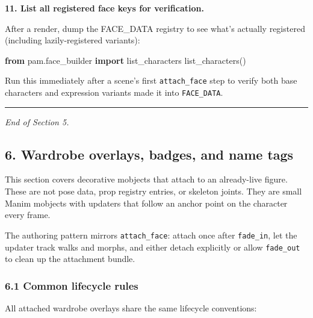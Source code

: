 \documentclass[
  12pt,
  letterpaper,
]{book}
\newenvironment{Shaded}{}{}
\newcommand{\ImportTok}[1]{\textcolor[rgb]{0.00,0.50,0.00}{\textbf{#1}}}
\newcommand{\NormalTok}[1]{#1}
\begin{document}
\textbf{11. List all registered face keys for verification.}

After a render, dump the FACE\_DATA registry to see what's actually
registered (including lazily-registered variants):

\begin{Shaded}
\begin{Highlighting}[]
\ImportTok{from}\NormalTok{ pam.face\_builder }\ImportTok{import}\NormalTok{ list\_characters}
\NormalTok{list\_characters()}
\end{Highlighting}
\end{Shaded}

Run this immediately after a scene's first \texttt{attach\_face} step to
verify both base characters and expression variants made it into
\texttt{FACE\_DATA}.

\begin{center}\rule{0.5\linewidth}{0.5pt}\end{center}

\emph{End of Section 5.}


\subsection{6. Wardrobe overlays, badges, and name
tags}\label{wardrobe-overlays-badges-and-name-tags}

This section covers decorative mobjects that attach to an already-live
figure. These are not pose data, prop registry entries, or skeleton
joints. They are small Manim mobjects with updaters that follow an
anchor point on the character every frame.

The authoring pattern mirrors \texttt{attach\_face}: attach once after
\texttt{fade\_in}, let the updater track walks and morphs, and either
detach explicitly or allow \texttt{fade\_out} to clean up the attachment
bundle.

\subsubsection{6.1 Common lifecycle rules}\label{common-lifecycle-rules}

All attached wardrobe overlays share the same lifecycle conventions:
\end{document}
